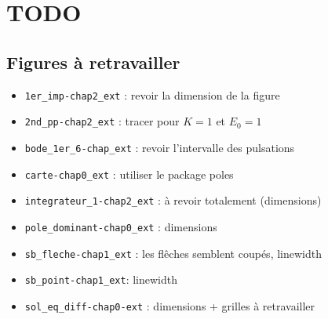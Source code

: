 \chapter{TODO}
\section*{Figures à retravailler}
\begin{itemize}
    \item \verb?1er_imp-chap2_ext? : revoir la dimension de la figure
    \item \verb?2nd_pp-chap2_ext? : tracer pour $K=1$ et $E_0=1$
    \item \verb?bode_1er_6-chap_ext? : revoir l'intervalle des pulsations
    \item \verb?carte-chap0_ext? : utiliser le package poles
    \item \verb?integrateur_1-chap2_ext? : à revoir totalement (dimensions)
    \item \verb?pole_dominant-chap0_ext? : dimensions
    \item \verb?sb_fleche-chap1_ext? : les flêches semblent coupés, linewidth
    \item \verb?sb_point-chap1_ext?: linewidth
    \item \verb?sol_eq_diff-chap0-ext? : dimensions + grilles à retravailler
\end{itemize}
